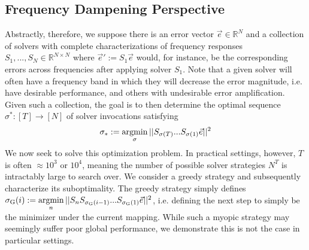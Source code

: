\documentclass[12pt]{article}
\begin{document}
\subsection{Frequency Dampening Perspective}
Abstractly, therefore, we suppose there is an error vector $\vec{e}\in\mathbb{R}^{N}$ and a collection of solvers with complete characterizations of frequency responses $S_1, ..., S_N\in\mathbb{R}^{N\times N}$ where $\vec{e}' := S_1 \vec{e}$ would, for instance, be the corresponding errors across frequencies after applying solver $S_1$. Note that a given solver will often have a frequency band in which they will decrease the error magnitude, i.e. have desirable performance, and others with undesirable error amplification. Given such a collection, the goal is to then determine the optimal sequence $\sigma^* : [T]\to[N]$ of solver invocations satisfying
\begin{equation}
    \sigma_* := \mathop{\mathrm{argmin}}\limits_{\sigma} || S_{\sigma(T)}...S_{\sigma(1)} \vec{e} ||^2
\end{equation}
We now seek to solve this optimization problem. In practical settings, however, $T$ is often $\approx 10^3$ or $10^4$, meaning the number of possible solver strategies $N^{T}$ is intractably large to search over. We consider a greedy strategy and subsequently characterize its suboptimality. The greedy strategy simply defines $\sigma_{\mathrm{G}}(i) := \mathop{\mathrm{argmin}}\limits_{n} || S_{n} S_{\sigma_{\mathrm{G}}(i-1)}...S_{\sigma_{\mathrm{G}}(1)} \vec{e} ||^2$, i.e. defining the next step to simply be the minimizer under the current mapping. While such a myopic strategy may seemingly suffer poor global performance, we demonstrate this is not the case in particular settings.
\end{document}
